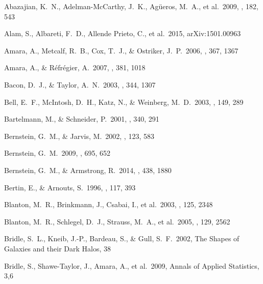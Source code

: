 \documentclass[apj]{emulateapj}
\begin{document}
%




%

\begin{thebibliography}{}

  Abazajian, K.~N.,
 Adelman-McCarthy, J.~K., Ag{\"u}eros, M.~A., et al.\ 2009, \apjs, 182, 543

 Alam, S., Albareti, F.~D.,
Allende Prieto, C., et al.\ 2015, arXiv:1501.00963

  Amara, A., Metcalf,
  R.~B., Cox, T.~J., \& Ostriker, J.~P.\ 2006, \mnras, 367, 1367

  Amara, A., \& R{\'e}fr{\'e}gier, A.\ 2007, \mnras, 381, 1018

 Bacon, D.~J., \& Taylor, A.~N.\ 2003, \mnras, 344, 1307

  Bell, E.~F., McIntosh,
D.~H., Katz, N., \& Weinberg, M.~D.\ 2003, \apjs, 149, 289

  Bartelmann, M., \& Schneider, P.\ 2001, \physrep, 340, 291

   Bernstein, G.~M., \& Jarvis, M.\ 2002, \aj, 123, 583

  Bernstein, G.~M.\ 2009,
   \apj, 695, 652

  Bernstein, G.~M., \& Armstrong, R.\ 2014, \mnras, 438, 1880

 Bertin, E., \& Arnouts, S.\ 1996, \aaps, 117, 393

 Blanton, M.~R.,
Brinkmann, J., Csabai, I., et al.\ 2003, \aj, 125, 2348


  Blanton, M.~R.,
   Schlegel, D.~J., Strauss, M.~A., et al.\ 2005, \aj, 129, 2562


  Bridle, S.~L., Kneib,
J.-P., Bardeau, S.,
\& Gull, S.~F.\ 2002, The Shapes of Galaxies and their Dark Halos, 38

  Bridle, S.,
Shawe-Taylor, J., Amara, A., et al.\ 2009, Annals of Applied Statistics, 3,6


\end{thebibliography}
\end{document}
